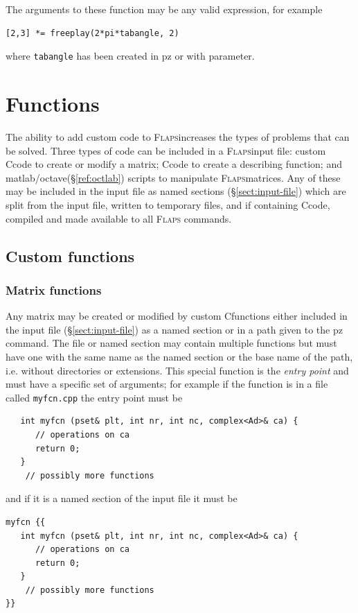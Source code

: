 \documentclass[11pt,openany,twoside]{book}
\numberwithin{equation}{section}		%
\def\Cpp{{C\nolinebreak[4]\hspace{-.05em}\raisebox{.4ex}{\tiny\bf ++}}\:}
\newcommand{\Cmd}[1]{{\sf #1}}
\newcommand{\Newterm}[1]{{\em #1}}	%
\newcommand{\Code}[1]{{\small\tt #1}}
\newcommand{\Flaps}{\textsc{Flaps\:}}
\newcommand{\Octlab}{\Cmd{matlab}/\Cmd{octave}\:}
\newcommand{\Sectref}[1]{\S\ref{#1}}
\begin{document}
The arguments to these function may be any valid expression, for example
\begin{lstlisting}
[2,3] *= freeplay(2*pi*tabangle, 2)
\end{lstlisting}
where \Code{tabangle} has been created in \Cmd{pz} or with \Cmd{parameter}.

\newpage
\chapter{Functions}\label{chap:functions}
The ability to add custom code to \Flaps increases the types
of problems that can be solved. Three types of code can be included
in a \Flaps input file: custom \Cpp code to create or modify a matrix;
\Cpp code to create a describing function; and \Octlab (\Sectref{ref:octlab})
scripts to manipulate \Flaps matrices.
Any of these may be included in the input file as named sections
(\Sectref{sect:input-file}) which
are split from the input file, written to temporary files, and
if containing \Cpp code, compiled and made available to all \Flaps
commands.

\section{Custom functions} 
\subsection{Matrix functions}
Any matrix may be created or modified by custom \Cpp functions either included
in the input file (\Sectref{sect:input-file}) as a named section 
or in a path given to the \Cmd{pz} command. The file or named section may contain
multiple functions but must have one with the same name as the named section
or the base name of the path, i.e. without directories or extensions. This
special function is the \Newterm{entry point} and must have a specific set
of arguments; for example if the function is in a file called \Code{myfcn.cpp}
the entry point must be
\begin{lstlisting}
   int myfcn (pset& plt, int nr, int nc, complex<Ad>& ca) {
      // operations on ca
      return 0;
   }
	// possibly more functions
\end{lstlisting}
and if it is a named section of the input file it must be
\begin{lstlisting}
myfcn {{
   int myfcn (pset& plt, int nr, int nc, complex<Ad>& ca) {
      // operations on ca
      return 0;
   }
	// possibly more functions
}}
\end{lstlisting}
\end{document}
